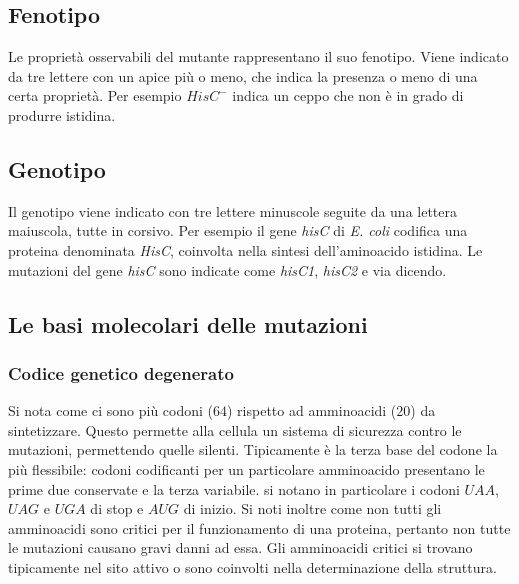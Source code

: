 	\subsection{Fenotipo}
	Le proprietà osservabili del mutante rappresentano il suo fenotipo. 
	Viene indicato da tre lettere con un apice  più o meno, che indica la presenza o meno di una certa proprietà. 
	Per esempio \emph{$HisC^{-}$} indica un ceppo che non è in grado di produrre istidina.

	\subsection{Genotipo}
	Il genotipo viene indicato con tre lettere minuscole seguite da una lettera maiuscola, tutte in corsivo. 
	Per esempio il gene \emph{hisC} di \textit{E. coli} codifica una proteina denominata \emph{HisC}, coinvolta nella sintesi dell'aminoacido istidina. 
	Le mutazioni del gene \emph{hisC} sono indicate come \emph{hisC1}, \emph{hisC2} e via dicendo. 

	\subsection{Le basi molecolari delle mutazioni}
		
		\subsubsection{Codice genetico degenerato}
		Si nota come ci sono pi\`u codoni ($64$) rispetto ad amminoacidi ($20$) da sintetizzare.
		Questo permette alla cellula un sistema di sicurezza contro le mutazioni, permettendo quelle silenti.
		Tipicamente \`e la terza base del codone la pi\`u flessibile: codoni codificanti per un particolare amminoacido presentano le prime due conservate e la terza variabile.
		si notano in particolare i codoni $UAA$, $UAG$ e $UGA$ di stop e $AUG$ di inizio.
		Si noti inoltre come non tutti gli amminoacidi sono critici per il funzionamento di una proteina, pertanto non tutte le mutazioni causano gravi danni ad essa.
		Gli amminoacidi critici si trovano tipicamente nel sito attivo o sono coinvolti nella determinazione della struttura.

